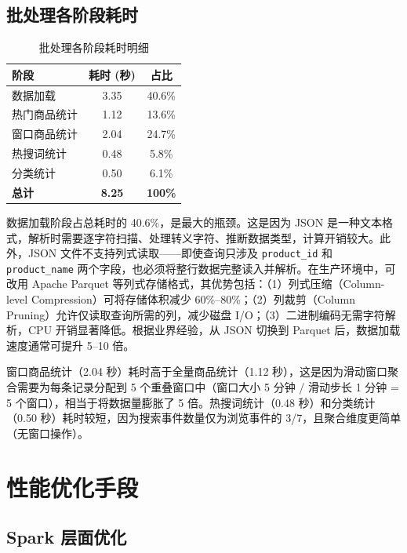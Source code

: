 \documentclass[12pt,a4paper]{article}
\begin{document}
\subsection{批处理各阶段耗时}

\begin{table}[H]
\centering
\caption{批处理各阶段耗时明细}
\label{tab:batch-perf}
\begin{tabular}{lcc}
\toprule
\textbf{阶段} & \textbf{耗时 (秒)} & \textbf{占比} \\
\midrule
数据加载 & 3.35 & 40.6\% \\
热门商品统计 & 1.12 & 13.6\% \\
窗口商品统计 & 2.04 & 24.7\% \\
热搜词统计 & 0.48 & 5.8\% \\
分类统计 & 0.50 & 6.1\% \\
\midrule
\textbf{总计} & \textbf{8.25} & \textbf{100\%} \\
\bottomrule
\end{tabular}
\end{table}

数据加载阶段占总耗时的 40.6\%，是最大的瓶颈。这是因为 JSON 是一种文本格式，解析时需要逐字符扫描、处理转义字符、推断数据类型，计算开销较大。此外，JSON 文件不支持列式读取——即使查询只涉及 \texttt{product\_id} 和 \texttt{product\_name} 两个字段，也必须将整行数据完整读入并解析。在生产环境中，可改用 Apache Parquet 等列式存储格式，其优势包括：（1）列式压缩（Column-level Compression）可将存储体积减少 60\%--80\%；（2）列裁剪（Column Pruning）允许仅读取查询所需的列，减少磁盘 I/O；（3）二进制编码无需字符解析，CPU 开销显著降低。根据业界经验，从 JSON 切换到 Parquet 后，数据加载速度通常可提升 5--10 倍。

窗口商品统计（2.04 秒）耗时高于全量商品统计（1.12 秒），这是因为滑动窗口聚合需要为每条记录分配到 5 个重叠窗口中（窗口大小 5 分钟 / 滑动步长 1 分钟 = 5 个窗口），相当于将数据量膨胀了 5 倍。热搜词统计（0.48 秒）和分类统计（0.50 秒）耗时较短，因为搜索事件数量仅为浏览事件的 3/7，且聚合维度更简单（无窗口操作）。

\section{性能优化手段}

\subsection{Spark 层面优化}
\end{document}
